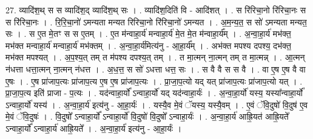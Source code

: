 \documentclass[17pt]{extarticle}
\begin{document}
27. व्यादि॑श॒थ् स स व्यादि॑श॒द् व्यादि॑श॒थ् सः । . व्यादि॑श॒दिति॑ वि - आदि॑शत् । . स रि॑रिचा॒नो रि॑रिचा॒नः स स रि॑रिचा॒नः । . रि॒रि॒चा॒नो॑ ऽमन्यता मन्यत रिरिचा॒नो रि॑रिचा॒नो॑ ऽमन्यत । . अ॒म॒न्य॒त॒ स सो॑ ऽमन्यता मन्यत॒ सः । . स ए॒त मे॒तꣳ स स ए॒तम् । . ए॒त म॑न्वाहा॒र्य॑ मन्वाहा॒र्य॑ मे॒त मे॒त म॑न्वाहा॒र्य᳚म् । . अ॒न्वा॒हा॒र्य॑ मभ॑क्त॒ मभ॑क्त मन्वाहा॒र्य॑ मन्वाहा॒र्य॑ मभ॑क्तम् । . अ॒न्वा॒हा॒र्य॑मित्य॑नु - आ॒हा॒र्य᳚म् । . अभ॑क्त मपश्य दपश्य॒ दभ॑क्त॒ मभ॑क्त मपश्यत् । . अ॒प॒श्य॒त् तम् त म॑पश्य दपश्य॒त् तम् । . त मा॒त्मन् ना॒त्मन् तम् त मा॒त्मन्न् । . आ॒त्मन् न॑धत्ता धत्ता॒त्मन् ना॒त्मन् न॑धत्त । . अ॒ध॒त्त॒ स सो॑ ऽधत्ता धत्त॒ सः । . स वै वै स स वै । . वा ए॒ष ए॒ष वै वा ए॒षः । . ए॒ष प्रा॑जाप॒त्यः प्रा॑जाप॒त्य ए॒ष ए॒ष प्रा॑जाप॒त्यः । . प्रा॒जा॒प॒त्यो यद् यत् प्रा॑जाप॒त्यः प्रा॑जाप॒त्यो यत् । . प्रा॒जा॒प॒त्य इति॑ प्राजा - प॒त्यः । . यद॑न्वाहा॒र्यो᳚ ऽन्वाहा॒र्यो॑ यद् यद॑न्वाहा॒र्यः॑ । . अ॒न्वा॒हा॒र्यो॑ यस्य॒ यस्या᳚न्वाहा॒र्यो᳚ ऽन्वाहा॒र्यो॑ यस्य॑ । . अ॒न्वा॒हा॒र्य॑ इत्य॑नु - आ॒हा॒र्यः॑ । . यस्यै॒व मे॒वं ॅयस्य॒ यस्यै॒वम् । . ए॒वं ॅवि॒दुषो॑ वि॒दुष॑ ए॒व मे॒वं ॅवि॒दुषः॑ । . वि॒दुषो᳚ ऽन्वाहा॒र्यो᳚ ऽन्वाहा॒र्यो॑ वि॒दुषो॑ वि॒दुषो᳚ ऽन्वाहा॒र्यः॑ । . अ॒न्वा॒हा॒र्य॑ आह्रि॒यत॑ आह्रि॒यते᳚ ऽन्वाहा॒र्यो᳚ ऽन्वाहा॒र्य॑ आह्रि॒यते᳚ । . अ॒न्वा॒हा॒र्य॑ इत्य॑नु - आ॒हा॒र्यः॑ । \newline
\end{document}
